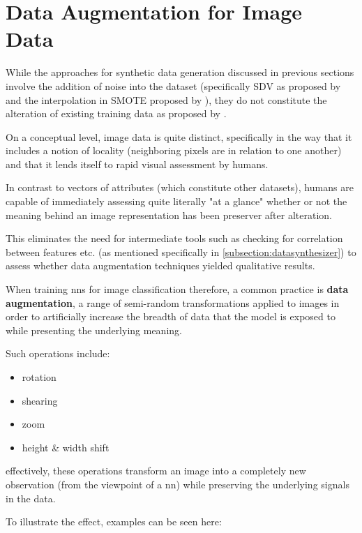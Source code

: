 \clearpage

\section{Data Augmentation for Image Data}
\label{section:image_augmentation}

While the approaches for synthetic data generation discussed in previous sections involve the addition of noise into the dataset (specifically \ac{SDV} as proposed by \cite{patki2016synthetic} and the interpolation in \ac{SMOTE} proposed by \cite{smote}), they do not constitute the alteration of existing training data as proposed by \cite{image_augmentation}.

On a conceptual level, image data is quite distinct, specifically in the way that it includes a notion of locality (neighboring pixels are in relation to one another) and that it lends itself to rapid visual assessment by humans. 

In contrast to vectors of attributes (which constitute other datasets), humans are capable of immediately assessing quite literally "at a glance" whether or not the meaning behind an image representation has been preserver after alteration. 

This eliminates the need for intermediate tools such as checking for correlation between features etc. (as mentioned specifically in \ref{subsection:datasynthesizer}) to assess whether data augmentation techniques yielded qualitative results.

When training \acp{nn} for image classification therefore, a common practice is \textbf{data augmentation}, a range of semi-random transformations applied to images in order to artificially increase the breadth of data that the model is exposed to while presenting the underlying meaning. 

\pagebreak

Such operations include:
\begin{itemize}
	\item rotation
	\item shearing
	\item zoom
	\item height \& width shift
\end{itemize}

effectively, these operations transform an image into a completely new observation (from the viewpoint of a \ac{nn}) while preserving the underlying signals in the data. 

To illustrate the effect, examples can be seen here:

